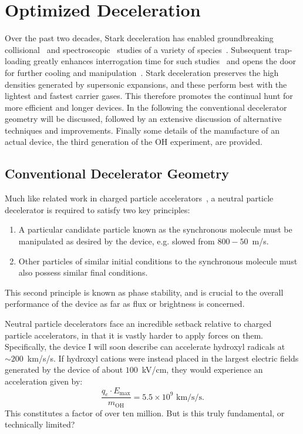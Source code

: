 \ifx\justbeingincluded\undefined


\fi

\chapter{Optimized Deceleration}
\label{chapter:slowing}

Over the past two decades, Stark deceleration has enabled groundbreaking collisional~\cite{Sawyer2011,Kirste2012,Gao2018} and spectroscopic~\cite{Veldhoven2004,Hudson2006,Lev2006,Fast2018} studies of a variety of species~\cite{VanDeMeerakker2012}. 
Subsequent trap-loading greatly enhances interrogation time for such studies~\cite{Sawyer2008} and opens the door for further cooling and manipulation~\cite{Stuhl2012evap, Reens2017}. 
Stark deceleration preserves the high densities generated by supersonic expansions, and these perform best with the lightest and fastest carrier gases.
This therefore promotes the continual hunt for more efficient and longer devices.
In the following the conventional decelerator geometry will be discussed, followed by an extensive discussion of alternative techniques and improvements.
Finally some details of the manufacture of an actual device, the third generation of the OH experiment, are provided.


\section{Conventional Decelerator Geometry}

Much like related work in charged particle accelerators~\cite{McMillan1945}, a neutral particle decelerator is required to satisfy two key principles:
\begin{enumerate}
\item A particular candidate particle known as the synchronous molecule must be manipulated as desired by the device, e.g. slowed from $800-50$~m/s.
\item Other particles of similar initial conditions to the synchronous molecule must also possess similar final conditions.
\end{enumerate}
This second principle is known as phase stability, and is crucial to the overall performance of the device as far as flux or brightness is concerned.

Neutral particle decelerators face an incredible setback relative to charged particle accelerators, in that it is vastly harder to apply forces on them.
Specifically, the device I will soon describe can accelerate hydroxyl radicals at $\sim 200$~km/s/s. 
If hydroxyl cations were instead placed in the largest electric fields generated by the device of about $100$~kV/cm, they would experience an acceleration given by:
\begin{equation}
\frac{q_e\cdot E_\text{max} }{m_\text{OH}} = 5.5\times 10^9\text{ km/s/s}.
\end{equation}
This constitutes a factor of over ten million. 
But is this truly fundamental, or technically limited? 

